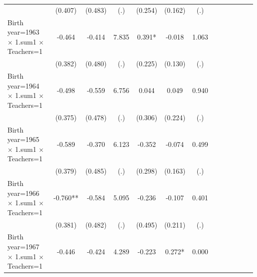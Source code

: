 {\begin{tabular}{l*{12}{c}}
                    &     (0.407)   &     (0.483)   &         (.)   &     (0.254)   &     (0.162)   &         (.)   &               &               &               &               &               &               \\
Birth year=1963 $\times$ 1.sum1 $\times$ Teachers=1&      -0.464   &      -0.414   &       7.835   &       0.391*  &      -0.018   &       1.063   &               &               &               &               &               &               \\
                    &     (0.382)   &     (0.480)   &         (.)   &     (0.225)   &     (0.130)   &         (.)   &               &               &               &               &               &               \\
Birth year=1964 $\times$ 1.sum1 $\times$ Teachers=1&      -0.498   &      -0.559   &       6.756   &       0.044   &       0.049   &       0.940   &               &               &               &               &               &               \\
                    &     (0.375)   &     (0.478)   &         (.)   &     (0.306)   &     (0.224)   &         (.)   &               &               &               &               &               &               \\
Birth year=1965 $\times$ 1.sum1 $\times$ Teachers=1&      -0.589   &      -0.370   &       6.123   &      -0.352   &      -0.074   &       0.499   &               &               &               &               &               &               \\
                    &     (0.379)   &     (0.485)   &         (.)   &     (0.298)   &     (0.163)   &         (.)   &               &               &               &               &               &               \\
Birth year=1966 $\times$ 1.sum1 $\times$ Teachers=1&      -0.760** &      -0.584   &       5.095   &      -0.236   &      -0.107   &       0.401   &               &               &               &               &               &               \\
                    &     (0.381)   &     (0.482)   &         (.)   &     (0.495)   &     (0.211)   &         (.)   &               &               &               &               &               &               \\
Birth year=1967 $\times$ 1.sum1 $\times$ Teachers=1&      -0.446   &      -0.424   &       4.289   &      -0.223   &       0.272*  &       0.000   &               &               &               &               &               &               \\

\end{tabular}}
